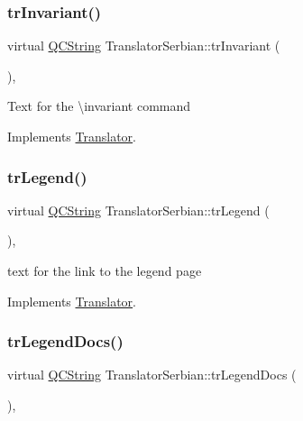 \subsubsection{\texorpdfstring{trInvariant()}{trInvariant()}}
{\footnotesize\ttfamily virtual \mbox{\hyperlink{class_q_c_string}{Q\+C\+String}} Translator\+Serbian\+::tr\+Invariant (\begin{DoxyParamCaption}{ }\end{DoxyParamCaption})\hspace{0.3cm}{\ttfamily [inline]}, {\ttfamily [virtual]}}

Text for the \textbackslash{}invariant command 

Implements \mbox{\hyperlink{class_translator}{Translator}}.

\mbox{\label{class_translator_serbian_ade75094177318f78da1b3f28b16ae63c}} 
\subsubsection{\texorpdfstring{trLegend()}{trLegend()}}
{\footnotesize\ttfamily virtual \mbox{\hyperlink{class_q_c_string}{Q\+C\+String}} Translator\+Serbian\+::tr\+Legend (\begin{DoxyParamCaption}{ }\end{DoxyParamCaption})\hspace{0.3cm}{\ttfamily [inline]}, {\ttfamily [virtual]}}

text for the link to the legend page 

Implements \mbox{\hyperlink{class_translator}{Translator}}.

\mbox{\label{class_translator_serbian_ad0a3e59f9fb3377e6af526f8f2a6eab9}} 
\subsubsection{\texorpdfstring{trLegendDocs()}{trLegendDocs()}}
{\footnotesize\ttfamily virtual \mbox{\hyperlink{class_q_c_string}{Q\+C\+String}} Translator\+Serbian\+::tr\+Legend\+Docs (\begin{DoxyParamCaption}{ }\end{DoxyParamCaption})\hspace{0.3cm}{\ttfamily [inline]}, {\ttfamily [virtual]}}

